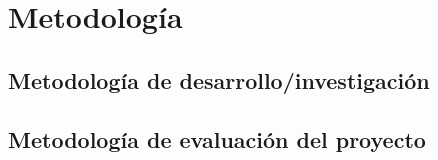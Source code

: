 \documentclass[11pt,letterpaper]{article}
\begin{document}
\section{Metodología}

\subsection{Metodología de desarrollo/investigación}



\subsection{Metodología de evaluación del proyecto}


%

%




\end{document}
